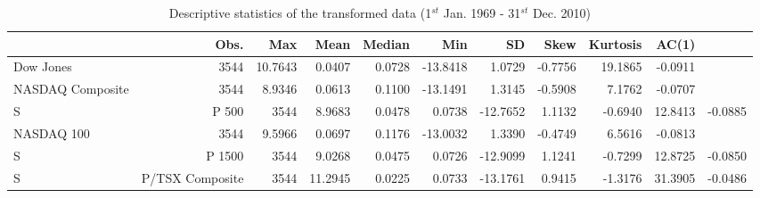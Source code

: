 \begin{table}
\caption{Descriptive statistics of the transformed data (1$^{st}$ Jan. 1969 - 31$^{st}$ Dec. 2010)}
\label{tab:desc_stats}
\begin{tabular}{lrrrrrrrrr}
\toprule
 & Obs. & Max & Mean & Median & Min & SD & Skew & Kurtosis & AC(1) \\
\midrule
Dow Jones & 3544 & 10.7643 & 0.0407 & 0.0728 & -13.8418 & 1.0729 & -0.7756 & 19.1865 & -0.0911 \\
NASDAQ Composite & 3544 & 8.9346 & 0.0613 & 0.1100 & -13.1491 & 1.3145 & -0.5908 & 7.1762 & -0.0707 \\
S&P 500 & 3544 & 8.9683 & 0.0478 & 0.0738 & -12.7652 & 1.1132 & -0.6940 & 12.8413 & -0.0885 \\
NASDAQ 100 & 3544 & 9.5966 & 0.0697 & 0.1176 & -13.0032 & 1.3390 & -0.4749 & 6.5616 & -0.0813 \\
S&P 1500 & 3544 & 9.0268 & 0.0475 & 0.0726 & -12.9099 & 1.1241 & -0.7299 & 12.8725 & -0.0850 \\
S&P/TSX Composite & 3544 & 11.2945 & 0.0225 & 0.0733 & -13.1761 & 0.9415 & -1.3176 & 31.3905 & -0.0486 \\
\bottomrule
\end{tabular}
\end{table}
